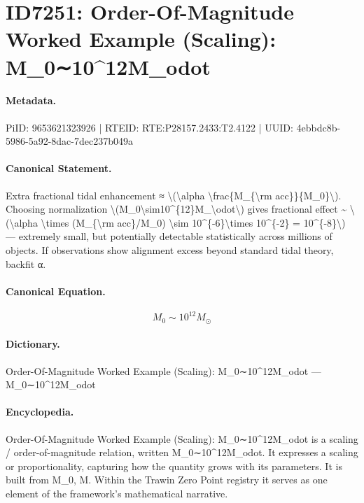 \section*{ID7251: Order-Of-Magnitude Worked Example (Scaling): M\_0∼10\textasciicircum{}12M\_odot}
\paragraph{Metadata.}
PiID: 9653621323926 | RTEID: RTE:P28157.2433:T2.4122 | UUID: 4ebbdc8b-5986-5a92-8dac-7dec237b049a

\paragraph{Canonical Statement.}
Extra fractional tidal enhancement ≈ \textbackslash{}(\textbackslash{}alpha \textbackslash{}frac\{M\_\{\textbackslash{}rm acc\}\}\{M\_0\}\textbackslash{}). Choosing normalization \textbackslash{}(M\_0\textbackslash{}sim10\textasciicircum{}\{12\}M\_\textbackslash{}odot\textbackslash{}) gives fractional effect \textasciitilde{} \textbackslash{}(\textbackslash{}alpha \textbackslash{}times (M\_\{\textbackslash{}rm acc\}/M\_0) \textbackslash{}sim 10\textasciicircum{}\{-6\}\textbackslash{}times 10\textasciicircum{}\{-2\} = 10\textasciicircum{}\{-8\}\textbackslash{}) — extremely small, but potentially detectable statistically across millions of objects. If observations show alignment excess beyond standard tidal theory, backfit α.

\paragraph{Canonical Equation.}
\[
M_0\sim10^{12}M_\odot
\]

\paragraph{Dictionary.}
Order-Of-Magnitude Worked Example (Scaling): M\_0∼10\textasciicircum{}12M\_odot — M\_0∼10\textasciicircum{}12M\_odot

\paragraph{Encyclopedia.}
Order-Of-Magnitude Worked Example (Scaling): M\_0∼10\textasciicircum{}12M\_odot is a scaling / order-of-magnitude relation, written M\_0∼10\textasciicircum{}12M\_odot. It expresses a scaling or proportionality, capturing how the quantity grows with its parameters. It is built from M\_0, M. Within the Trawin Zero Point registry it serves as one element of the framework's mathematical narrative.
